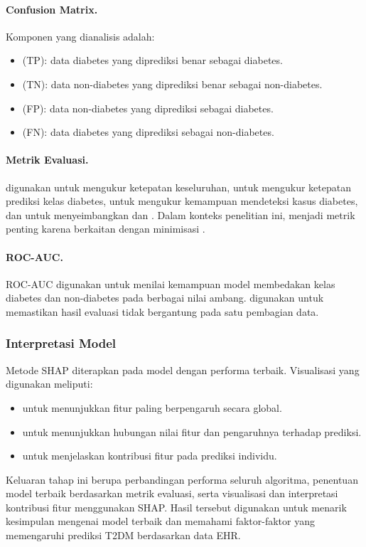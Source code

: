 \paragraph{Confusion Matrix.}
Komponen yang dianalisis adalah:
\begin{itemize}
\item {} (TP): data diabetes yang diprediksi benar sebagai diabetes.
\item {} (TN): data non-diabetes yang diprediksi benar sebagai non-diabetes.
\item {} (FP): data non-diabetes yang diprediksi sebagai diabetes.
\item {} (FN): data diabetes yang diprediksi sebagai non-diabetes.
\end{itemize}

\paragraph{Metrik Evaluasi.}
 digunakan untuk mengukur ketepatan keseluruhan,  untuk mengukur ketepatan prediksi kelas diabetes,  untuk mengukur kemampuan mendeteksi kasus diabetes, dan  untuk menyeimbangkan  dan . Dalam konteks penelitian ini,  menjadi metrik penting karena berkaitan dengan minimisasi .

\paragraph{ROC-AUC.}
ROC-AUC digunakan untuk menilai kemampuan model membedakan kelas diabetes dan non-diabetes pada berbagai nilai ambang.  digunakan untuk memastikan hasil evaluasi tidak bergantung pada satu pembagian data.

\subsubsection{Interpretasi Model}
Metode SHAP diterapkan pada model dengan performa terbaik. Visualisasi yang digunakan meliputi:
\begin{itemize}
\item {} untuk menunjukkan fitur paling berpengaruh secara global.
\item {} untuk menunjukkan hubungan nilai fitur dan pengaruhnya terhadap prediksi.
\item {} untuk menjelaskan kontribusi fitur pada prediksi individu.
\end{itemize}

Keluaran tahap ini berupa perbandingan performa seluruh algoritma, penentuan model terbaik berdasarkan metrik evaluasi, serta visualisasi dan interpretasi kontribusi fitur menggunakan SHAP. Hasil tersebut digunakan untuk menarik kesimpulan mengenai model terbaik dan memahami faktor-faktor yang memengaruhi prediksi T2DM berdasarkan data EHR.
